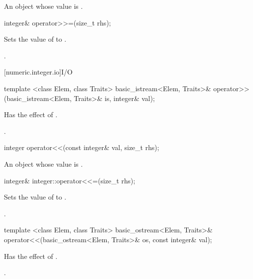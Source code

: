 \begin{itemdescr}
\returns An object whose value is .		
\end{itemdescr}

\begin{itemdecl}
integer& operator>>=(size_t rhs);	
\end{itemdecl}

\begin{itemdescr}
\effects Sets the value of  to .

\returns {}.		
\end{itemdescr}

[numeric.integer.io]{I/O}

\begin{itemdecl}
template <class Elem, class Traits>
  basic_istream<Elem, Traits>& operator>>(basic_istream<Elem, Traits>& is, integer& val);	
\end{itemdecl}

\begin{itemdescr}
\effects Has the effect of .

\returns {}.		
\end{itemdescr}

\begin{itemdecl}
integer operator<<(const integer& val, size_t rhs);	
\end{itemdecl}

\begin{itemdescr}
\returns An object whose value is .		
\end{itemdescr}

\begin{itemdecl}
integer& integer::operator<<=(size_t rhs);	
\end{itemdecl}

\begin{itemdescr}
\effects Sets the value of  to .

\returns {}.		
\end{itemdescr}

\begin{itemdecl}
template <class Elem, class Traits>
  basic_ostream<Elem, Traits>& operator<<(basic_ostream<Elem, Traits>& os, const integer& val);	
\end{itemdecl}

\begin{itemdescr}
\effects Has the effect of .

\returns {}.		
\end{itemdescr}
